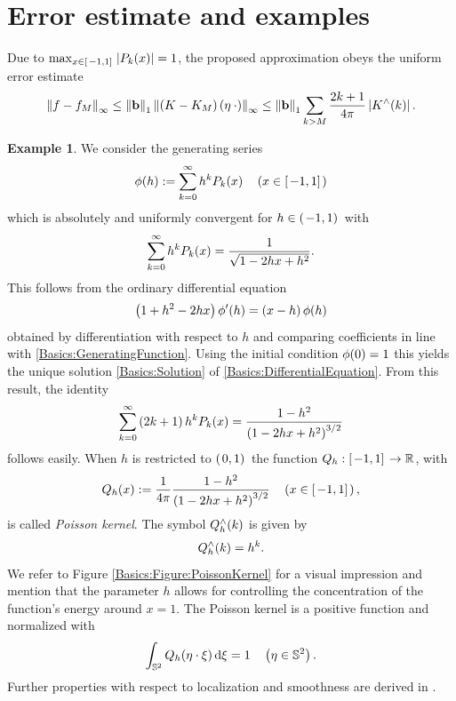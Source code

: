 \documentclass[11pt,a4paper,twoside,bibtotoc]{scrartcl}
\theoremstyle{plain}
\theoremstyle{definition}
\newtheorem{example}[theorem]{Example}
\theoremstyle{remark}
\numberwithin{equation}{section}
\numberwithin{table}{section}
\numberwithin{figure}{section}
\begin{document}
\section{Error estimate and examples}
\label{Basics:SphericalKernels}
Due to $\max_{x \in \left[\left.-1,1\right]\right.} \left\vert P_{k}{\hspace{-0.4ex}}\left(x\right)\right\vert = 1$, the
proposed approximation obeys the uniform error estimate
\begin{equation}
  \label{error}
  \left\|f - f_{M}\right\|_{\infty} \le
  \left\|\mathbf{b}\right\|_1 \left\|\left(K-K_M\right){\hspace{-0.4ex}}\left(\mathbf{\eta} \: \cdot
  \right)\right\|_{\infty} \le \left\|\mathbf{b}\right\|_1 \sum_{k>M} \frac{2k+1}{4\pi}
  \left\vert K^{\wedge}{\hspace{-0.4ex}}\left(k\right)\right\vert.
\end{equation}

\begin{example}
We consider the generating series
\begin{equation}
  \label{Basics:GeneratingFunction}
  \phi{\hspace{-0.4ex}}\left(h\right) := \sum_{k = 0}^{\infty} h^k P_k{\hspace{-0.4ex}}\left(x\right) \quad \left(x \in \left[\left.-1,1\right]\right.\right)
\end{equation}
which is absolutely and uniformly convergent for $h \in
\left(\left.-1,1\right)\right.$ with
\begin{equation}
  \label{Basics:Solution}
  \sum_{k = 0}^{\infty} h^k P_k{\hspace{-0.4ex}}\left(x\right) = \frac{1}{\sqrt{1-2hx+h^2}}.
\end{equation}
This follows from the ordinary differential equation
\begin{equation}
\label{Basics:DifferentialEquation}
  \left(1+h^2-2hx\right)\phi'{\hspace{-0.4ex}}\left(h\right) = \left(x-h\right)\phi{\hspace{-0.4ex}}\left(h\right)
\end{equation}
obtained by differentiation with respect to $h$ and comparing coefficients in line with \eqref{Basics:GeneratingFunction}. Using the initial 
condition $\phi{\hspace{-0.4ex}}\left(0\right)=1$ this yields the unique solution \eqref{Basics:Solution} of \eqref{Basics:DifferentialEquation}.
From this result, the identity
\begin{equation}
  \nonumber
  \sum_{k=0}^{\infty} \left(2k+1\right) h^k P_k{\hspace{-0.4ex}}\left(x\right) =
  \frac{1-h^2}{\left(1-2hx+h^2\right)^{3/2}}
\end{equation}
 follows easily. When $h$ is restricted to $\left(\left.0,1\right)\right.$ the function
$Q_{h}:\left[\left.-1,1\right]\right. \rightarrow \mathbb{R}$, with
\begin{equation}
  \label{PoissonKernel}
  \nonumber
  Q_{h}{\hspace{-0.4ex}}\left(x\right) := \frac{1}{4\pi} \frac{1-h^2}{\left(1-2hx+h^2\right)^{3/2}} \quad \left(x \in \left[\left.-1,1\right]\right.\right),
\end{equation}
is called \emph{Poisson kernel}. The symbol $Q_{h}^{\wedge}{\hspace{-0.4ex}}\left(k\right)$ is given by 
\[
  Q_{h}^{\wedge}{\hspace{-0.4ex}}\left(k\right) = h^k.
\]
We refer to Figure \ref{Basics:Figure:PoissonKernel} 
for a visual impression and mention that the parameter $h$
allows for controlling the concentration of the function's energy around
$x = 1$. The Poisson kernel is a positive function and normalized with
\[
  \int_{\mathbb{S}^2} Q_{h}{\hspace{-0.4ex}}\left(\mathbf{\eta} \cdot \mathbf{\xi}\right) \text{\rm{d}} \mathbf{\xi} = 1 \quad \left(\mathbf{\eta} \in \mathbb{S}^2\right).
\]
Further properties with respect to localization and smoothness are derived in \cite[pp. 112]{frgesc}.
\end{example}
\end{document}
